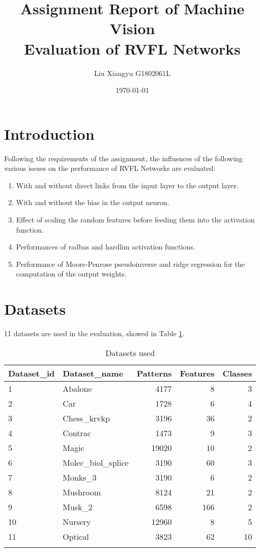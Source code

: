 \documentclass[12pt]{article}
\begin{document}
\title{Assignment Report of Machine Vision\\
	 \large Evaluation of RVFL Networks}
\author{Liu Xiangyu G1802061L}
\date{\today}
\maketitle

\section{Introduction}
Following the requirements of the assignment, the influences of the following various issues on the performance of RVFL Networks are evaluated:
\begin{enumerate}
	\item With and without direct links from the input layer to the output layer.
	\item With and without the bias in the output neuron.
	\item Effect of scaling the random features before feeding them into the activation function.
	\item Performances of radbas and hardlim activation functions.
	\item Performance of Moore-Penrose pseudoinverse and ridge regression for the computation of the output weights.
\end{enumerate}

\section{Datasets}
11 datasets are used in the evaluation, showed in Table \ref{table:datasets}.

\begin{table}[h]
\centering
\caption{Datasets used}
\begin{tabular}{llrrr}
	\hline
	Dataset\_id&Dataset\_name&Patterns&Features&Classes\\
	\hline
	1&Abalone&4177&8&3\\
	2&Car&1728&6&4\\
	3&Chess\_krvkp&3196&36&2\\
	4&Contrac&1473&9&3\\
	5&Magic&19020&10&2\\
	6&Molec\_biol\_splice&3190&60&3\\
	7&Monks\_3&3190&6&2\\
	8&Mushroom&8124&21&2\\
	9&Musk\_2&6598&166&2\\
	10&Nursery&12960&8&5\\
	11&Optical&3823&62&10\\
	\hline
\label{table:datasets}
\end{tabular}
\end{table}
\end{document}
